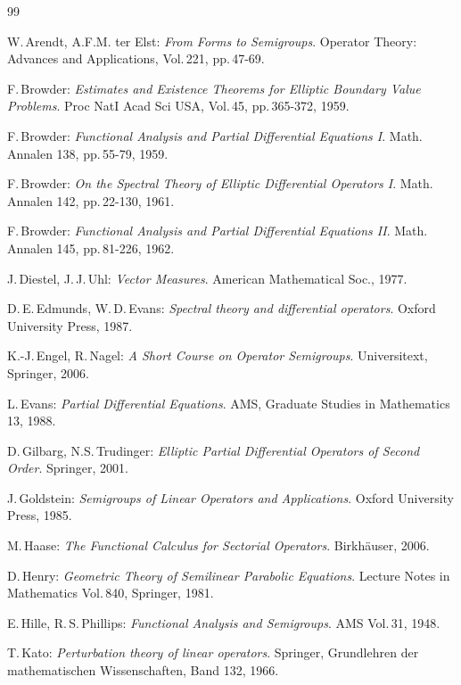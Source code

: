 \documentclass[11pt,twoside]{article}
\begin{document}
\vspace{8mm}
\begin{thebibliography}{99}
\begin{small}

 W.\,Arendt, A.F.M. ter Elst:
\textit{From Forms to Semigroups}.
Operator Theory: Advances and Applications, Vol.\,221, pp.\,47-69.

 F.\,Browder:
\textit{Estimates and Existence Theorems for Elliptic Boundary Value Problems}.
Proc NatI Acad Sci USA, Vol.\,45, pp.\,365-372, 1959.

 F.\,Browder:
\textit{Functional Analysis and Partial Differential Equations I}.
Math. Annalen 138, pp.\,55-79, 1959.

 F.\,Browder:
\textit{On the Spectral Theory of Elliptic Differential Operators I}.
Math. Annalen 142, pp.\,22-130, 1961.

 F.\,Browder:
\textit{Functional Analysis and Partial Differential Equations II}.
Math. Annalen 145, pp.\,81-226, 1962.

  J.\,Diestel, J.\,J.\,Uhl:
\textit{Vector Measures}.
American Mathematical Soc., 1977.

  D.\,E.\,Edmunds, W.\,D.\,Evans:
\textit{Spectral theory and differential operators}.
Oxford University Press, 1987.

  K.-J.\,Engel, R.\,Nagel:
\textit{A Short Course on Operator Semigroups}.
Universitext, Springer, 2006.

  L.\,Evans: \textit{Partial Differential Equations}.
AMS, Graduate Studies in Mathematics 13, 1988.

  D.\,Gilbarg, N.S.\,Trudinger:
\textit{Elliptic Partial Differential Operators of Second Order}.
Springer, 2001.

  J.\,Goldstein:
\textit{Semigroups of Linear Operators and Applications}.
Oxford University Press, 1985.

  M.\,Haase:
\textit{The Functional Calculus for Sectorial Operators}.
Birk\-h\"{a}user, 2006.

  D.\,Henry:
\textit{Geometric Theory of Semilinear Parabolic Equations}.
Lecture Notes in Mathematics Vol.\,840, Springer, 1981.

  E.\,Hille, R.\,S.\,Phillips:
\textit{Functional Analysis and Semigroups}.
AMS Vol.\,31, 1948.

  T.\,Kato:
\textit{{Perturbation theory of linear operators}}.
Springer, Grund\-lehren der mathematischen Wissenschaften, Band 132, 1966.


\end{small}
\end{thebibliography}
\end{document}
